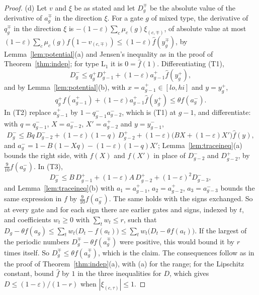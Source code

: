 \documentclass[11pt]{amsart}
\theoremstyle{definition}
\theoremstyle{remark}
\newcommand{\eps}{\varepsilon}
\begin{document}
\begin{proof}
(d) Let $v$ and $\xi$ be as stated and let $D^\mp_g$ be the absolute value of the derivative of
$a^\mp_g$ in the direction $\xi$. For a gate $g$ of mixed type, the derivative of $q^\mp_g$ in
the direction $\xi$ is $-(1-\eps)\sum_c\mu_c(g)\xi_{(c,\mp)}$, of absolute value at most
$(1-\eps)\sum_c\mu_c(g)f(1-v_{(c,\mp)})\le(1-\eps)\hat f(y^\mp_g)$, by
Lemma~\ref{lem:potential}(a) and Jensen's inequality as in the proof of
Theorem~\ref{thm:indep}; for type $\mathrm L_1$ it is $0=\hat f(1)$. Differentiating (T1),
\[
D^-_g\le q^+_gD^+_{g-1}+(1-\eps)a^+_{g-1}\hat f(y^+_g),
\]
and by Lemma~\ref{lem:potential}(b), with $x=a^+_{g-1}\in[lo,hi]$ and $y=y^+_g$,
\[
q^+_gf(a^+_{g-1})+(1-\eps)a^+_{g-1}\hat f(y^+_g)\le\theta f(a^-_g).
\]
In (T2) replace $a^+_{g-1}$ by $1-q^-_{g-1}a^-_{g-2}$, which is (T1) at $g-1$, and differentiate:
with $q=q^-_{g-1}$, $X=a^-_{g-2}$, $X'=a^+_{g-2}$ and $y=y^-_{g-1}$,
\[
D^-_g\le Bq\,D^-_{g-2}+(1-\eps)(1-q)\,D^+_{g-2}+(1-\eps)\bigl(BX+(1-\eps)X'\bigr)\hat f(y),
\]
and $a^-_g=1-B(1-Xq)-(1-\eps)(1-q)X'$; Lemma~\ref{lem:traceineq}(a) bounds the right side, with
$f(X)$ and $f(X')$ in place of $D^-_{g-2}$ and $D^+_{g-2}$, by $\frac9{10}f(a^-_g)$. In (T3),
\[
D^-_g\le B\,D^+_{g-1}+(1-\eps)A\,D^+_{g-2}+(1-\eps)^2D^-_{g-3},
\]
and Lemma~\ref{lem:traceineq}(b) with $a_1=a^+_{g-1}$, $a_2=a^+_{g-2}$, $a_3=a^-_{g-3}$ bounds
the same expression in $f$ by $\frac9{10}f(a^-_g)$. The same holds with the signs exchanged. So
at every gate and for each sign there are earlier gates and signs, indexed by $t$, and
coefficients $w_t\ge0$ with $\sum_tw_t\le r$, such that
$D_g-\theta f(a_g)\le\sum_tw_t\bigl(D_t-f(a_t)\bigr)\le\sum_tw_t\bigl(D_t-\theta f(a_t)\bigr)$.
If the largest of the periodic numbers $D^\mp_g-\theta f(a^\mp_g)$ were positive, this would
bound it by $r$ times itself. So $D^\mp_g\le\theta f(a^\mp_g)$, which is the claim. The
consequences follow as in the proof of Theorem~\ref{thm:indep}(a), with (a) for the range; for
the Lipschitz constant, bound $\hat f$ by $1$ in the three inequalities for $D$, which gives
$D\le(1-\eps)/(1-r)$ when $|\xi_{(c,\tau)}|\le1$.


\end{proof}
\end{document}
